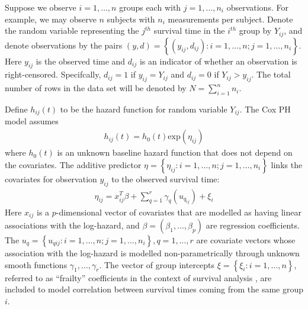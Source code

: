\documentclass[]{article}
\begin{document}
Suppose we observe $i = 1,\ldots,n$ groups each with $j = 1,\ldots,n_{i}$ observations. For example, we may observe $n$ subjects with $n_{i}$ measurements per subject. Denote the random variable representing the $j^{th}$ survival time in the $i^{th}$ group by $Y_{ij}$, and denote observations by the pairs $(y,d) =  \left\{(y_{ij},d_{ij}): i = 1,\ldots,n; j = 1,\ldots,n_{i} \right\}$. Here $y_{ij}$ is the observed time and $d_{ij}$ is an indicator of whether an observation is right-censored. Specifcally, $d_{ij} = 1$ if $y_{ij} = Y_{ij}$ and $d_{ij} = 0$ if $Y_{ij} > y_{ij}$. The total number of rows in the data set will be denoted by $N = \sum_{i=1}^{n}n_{i}$.

Define $h_{ij}(t)$ to be the hazard function for random variable $Y_{ij}$. The Cox PH model assumes \citep{coxph}
\begin{equation}\begin{aligned}\label{eqn:CoxHazardModel}
h_{ij}(t) = h_0(t)\text{exp}(\eta_{ij})
\end{aligned}\end{equation}
where $h_0(t)$ is an unknown baseline hazard function that does not depend on the covariates. The additive predictor $\eta = \left\{ \eta_{ij}: i = 1,\ldots,n; j = 1,\ldots,n_{i}\right\}$ links the covariates for observation $y_{ij}$ to the observed survival time:
\begin{equation}\begin{aligned}\label{eqn:eta}
\eta_{ij} =x_{ij}^{T}\beta+\sum_{q=1}^{r} \gamma_q(u_{q_{ij}}) +\xi_{i}
\end{aligned}\end{equation}
Here $x_{ij}$ is a $p$-dimensional vector of covariates that are modelled as having linear associations with the log-hazard, and $\beta = (\beta_{1},\ldots,\beta_{p})$ are regression coefficients. The $u_{q} = \left\{u_{qij}: i = 1,\ldots,n; j = 1,\ldots,n_{i} \right\}, q = 1,\ldots,r$ are covariate vectors whose association with the log-hazard is modelled non-parametrically through unknown smooth functions $\gamma_1,\ldots,\gamma_r$. The vector of group intercepts $\xi = \left\{ \xi_{i}: i=1,\ldots,n\right\}$, referred to as ``frailty'' coefficients in the context of survival analysis \citep{frailty}, are included to model correlation between survival times coming from the same group $i$.
\end{document}
